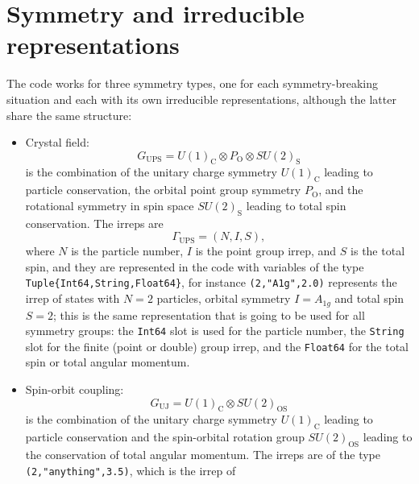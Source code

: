 \documentclass[notitlepage]{article}
\begin{document}
\section{Symmetry and irreducible representations}
\label{symmetry_and_irreducible_representations}
The code works for three symmetry types, one for each
symmetry-breaking situation and each with its own
irreducible representations, although the latter share the
same structure:
\begin{itemize}
    \item Crystal field:
        \begin{equation}
            G_\text{UPS} = 
            U(1)_\text{C} \otimes
            P_\text{O} \otimes
            SU(2)_\text{S}
        \end{equation}
        is the combination of the unitary charge symmetry
        $U(1)_\text{C}$ leading to particle conservation, the
        orbital point group symmetry $P_\text{O}$, and the
        rotational symmetry in spin space $SU(2)_\text{S}$ leading
        to total spin conservation. The irreps are 
        \begin{equation}
            \Gamma_\text{UPS} = (N,I,S),
        \end{equation}
        where $N$ is the particle number, $I$ is the point
        group irrep, and $S$ is the total spin, and they are
        represented in the code with variables of the type
        \texttt{Tuple\{Int64,String,Float64\}}, for instance 
        \texttt{(2,"A1g",2.0)} represents the irrep of
        states with $N=2$ particles, orbital symmetry
        $I=A_{1g}$ and total spin $S=2$; this
        is the same representation that is going to be used
        for all symmetry groups: the \texttt{Int64} slot is
        used for the particle number, the \texttt{String}
        slot for the finite (point or double) group irrep,
        and the \texttt{Float64} for the total spin or total
        angular momentum.
    \item Spin-orbit coupling:
        \begin{equation}
            G_\text{UJ} =
            U(1)_\text{C} \otimes
            SU(2)_\text{OS}
        \end{equation}
        is the combination of the unitary charge symmetry
        $U(1)_\text{C}$ leading to particle conservation and
        the spin-orbital rotation group $SU(2)_\text{OS}$
        leading to the conservation of total angular
        momentum. The irreps are of the type
        \texttt{(2,"anything",3.5)}, which is the irrep of

\end{itemize}
\end{document}
